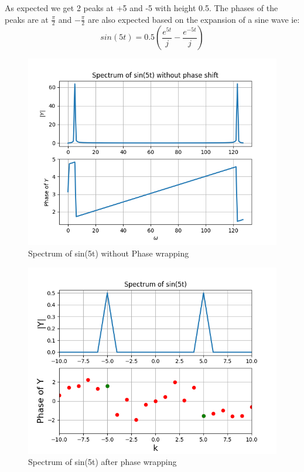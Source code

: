 \documentclass{article}
\begin{document}
As expected we get 2 peaks at +5 and -5 with height 0.5. The phases of the peaks are at $\frac{\pi}{2}$ and $-\frac{\pi}{2}$ are also expected based on the expansion of a sine wave ie:
\begin{equation}
sin(5t) = 0.5(\frac{e^{5t}}{j}-\frac{e^{-5t}}{j})
\end{equation}
\begin{figure}[h!]
\centering
\includegraphics[scale=0.6]{Ass8_Figure_1.png}
\caption{Spectrum of sin(5t) without Phase wrapping}
\label{fig:universe}
\end{figure}

\begin{figure}[h!]
\centering
\includegraphics[scale=0.6]{Ass8_Figure_2.png}
\caption{Spectrum of sin(5t) after phase wrapping}
\label{fig:universe}
\end{figure}
\cleardoublepage
\end{document}
